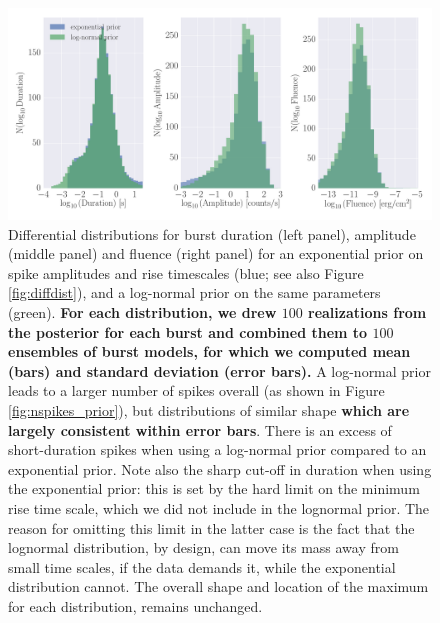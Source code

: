 \documentclass[12pt]{emulateapj}
\begin{document}
\begin{figure}[htbp]
\begin{center}
\includegraphics[width=\textwidth]{f12.pdf}%
\caption{Differential distributions for burst duration (left panel), amplitude (middle panel) and fluence (right panel) for an exponential prior on spike 
amplitudes and rise timescales (blue; see also Figure \ref{fig:diffdist}),
and a log-normal prior on the same parameters (green). {\bf For each distribution, we drew $100$ realizations from the posterior for each burst and combined them to $100$ ensembles of burst models, for which we computed mean (bars) and standard deviation (error bars).}  A log-normal prior leads to a larger number of spikes overall (as shown in Figure \ref{fig:nspikes_prior}), but distributions of
similar shape {\bf which are largely consistent within error bars}. There is an excess of short-duration spikes when using a log-normal prior compared to an exponential prior. Note also the 
sharp cut-off in duration when using the exponential prior: this is set by the hard limit on the minimum rise time scale, which we did not include in the lognormal prior. 
The reason for omitting this limit in the latter case is the fact that the lognormal distribution, by design, can move its mass away from small time scales, if the data 
demands it, while the exponential distribution cannot. The overall shape and location of the maximum for each distribution, remains unchanged.}
\label{fig:diff_prior}
\end{center}
\end{figure}
\end{document}
